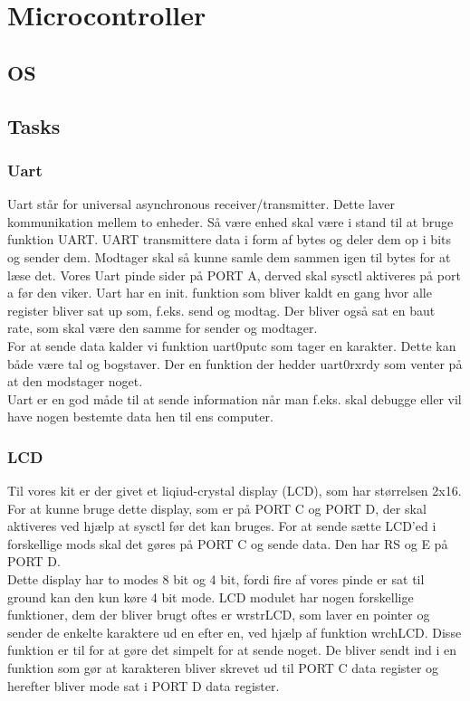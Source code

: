 \section{Microcontroller}

\subsection{OS}

\subsection{Tasks}

\subsubsection{Uart}

Uart står for universal asynchronous receiver/transmitter. Dette laver kommunikation mellem to enheder. Så være enhed skal være i stand til at bruge funktion UART. UART transmittere data i form af bytes og deler dem op i bits og sender dem. Modtager skal så kunne samle dem sammen igen til bytes for at læse det.
Vores Uart pinde sider på PORT A, derved skal sysctl aktiveres på port a før den viker. Uart har en init. funktion som bliver kaldt en gang hvor alle register bliver sat up som, f.eks. send og modtag. Der bliver også sat en baut rate, som skal være den samme for sender og modtager.
\\
For at sende data kalder vi funktion uart0\textunderscore putc som tager en karakter. Dette kan både være tal og bogstaver. Der en funktion der hedder uart0\textunderscore rx\textunderscore rdy som venter på at den modstager noget.
\\
Uart er en god måde til at sende information når man f.eks. skal debugge eller vil have nogen bestemte data hen til ens computer.

\subsubsection{LCD}

Til vores kit er der givet et liqiud-crystal display (LCD), som har størrelsen 2x16. For at kunne bruge dette display, som er på PORT C og PORT D, der skal aktiveres ved hjælp at sysctl før det kan bruges. For at sende sætte LCD’ed i forskellige mods skal det gøres på PORT C og sende data. Den har RS og E på PORT D.
\\
Dette display har to modes 8 bit og 4 bit, fordi fire af vores pinde er sat til ground kan den kun køre 4 bit mode.
LCD modulet har nogen forskellige funktioner, dem der bliver brugt oftes er wr\textunderscore str\textunderscore LCD, som laver en pointer og sender de enkelte karaktere ud en efter en, ved hjælp af funktion wr\textunderscore ch\textunderscore LCD. Disse funktion er til for at gøre det simpelt for at sende noget. De bliver sendt ind i en funktion som gør at karakteren bliver skrevet ud til PORT C data register og herefter bliver mode sat i PORT D data register.

